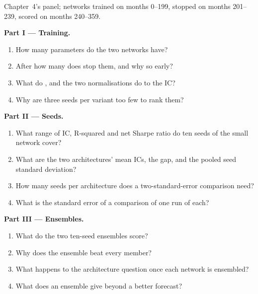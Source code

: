 \begin{problem}\label{pb:ml:neural-networks-for-noisy-tabular-data:1}
Chapter~4's panel; networks trained on months 0--199, stopped on months 201--239, scored on months 240--359.

\medskip\noindent\textbf{Part I --- Training.}
\begin{enumerate}
\item How many parameters do the two networks have?
\item After how many  does  stop them, and why so early?
\item What do ,  and the two normalisations do to the IC?
\item Why are three seeds per variant too few to rank them?
\end{enumerate}

\medskip\noindent\textbf{Part II --- Seeds.}
\begin{enumerate}[resume]
\item What range of IC, R-squared and net Sharpe ratio do ten seeds of the small network cover?
\item What are the two architectures' mean ICs, the gap, and the pooled seed standard deviation?
\item How many seeds per architecture does a two-standard-error comparison need?
\item What is the standard error of a comparison of one run of each?
\end{enumerate}

\medskip\noindent\textbf{Part III --- Ensembles.}
\begin{enumerate}[resume]
\item What do the two ten-seed ensembles score?
\item Why does the ensemble beat every member?
\item What happens to the architecture question once each network is ensembled?
\item What does an ensemble give beyond a better forecast?
\end{enumerate}


\end{problem}
